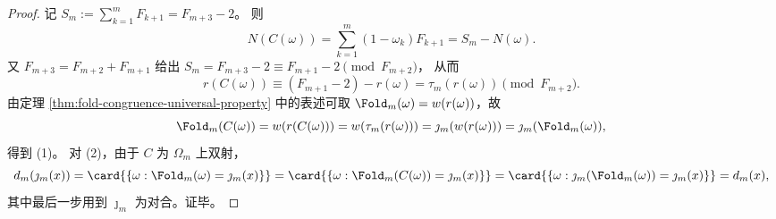 \begin{proof}
记 \(S_m:=\sum_{k=1}^m F_{k+1}=F_{m+3}-2\)。
则
\[
N(C(\omega))=\sum_{k=1}^m(1-\omega_k)F_{k+1}=S_m-N(\omega).
\]
又 \(F_{m+3}=F_{m+2}+F_{m+1}\) 给出
\(
S_m=F_{m+3}-2\equiv F_{m+1}-2\pmod{F_{m+2}}
\)，
从而
\[
r(C(\omega))\equiv (F_{m+1}-2)-r(\omega)=\tau_m(r(\omega))\pmod{F_{m+2}}.
\]
由定理 \ref{thm:fold-congruence-universal-property} 中的表述可取 \(\Fold_m(\omega)=w(r(\omega))\)，故
\[
\Fold_m(C(\omega))=w(r(C(\omega)))=w(\tau_m(r(\omega)))=\jmath_m(w(r(\omega)))=\jmath_m(\Fold_m(\omega)),
\]
得到 (1)。
对 (2)，由于 \(C\) 为 \(\Omega_m\) 上双射，
\[
d_m(\jmath_m(x))
=\card{\{\omega:\Fold_m(\omega)=\jmath_m(x)\}}
=\card{\{\omega:\Fold_m(C(\omega))=\jmath_m(x)\}}
=\card{\{\omega:\jmath_m(\Fold_m(\omega))=\jmath_m(x)\}}
=d_m(x),
\]
其中最后一步用到 \(\jmath_m\) 为对合。证毕。
\end{proof}

